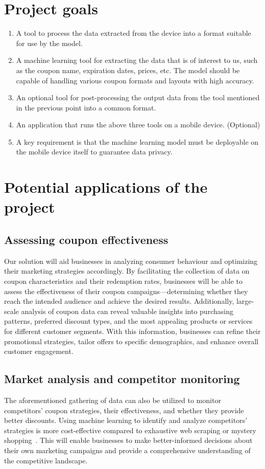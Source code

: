 \documentclass[licencjacka,en]{docs/pracamgr}
\begin{document}
\section{Project goals}
\begin{enumerate}
    \item A tool to process the data extracted from the device into a format suitable for use by the model.
    \item A machine learning tool for extracting the data that is of interest to us, such as the coupon name, expiration dates, prices, etc. The model should be capable of handling various coupon formats and layouts with high accuracy.
    \item An optional tool for post-processing the output data from the tool mentioned in the previous point into a common format.
    \item An application that runs the above three tools on a mobile device. (Optional)
    \item A key requirement is that the machine learning model must be deployable on the mobile device itself to guarantee data privacy.
\end{enumerate} 


\section{Potential applications of the project}
\subsection{Assessing coupon effectiveness}
Our solution will aid businesses in analyzing consumer behaviour and optimizing their marketing strategies accordingly. By facilitating the collection of data on coupon characteristics and their redemption rates, businesses will be able to assess the effectiveness of their coupon campaigns—determining whether they reach the intended audience and achieve the desired results. Additionally, large-scale analysis of coupon data can reveal valuable insights into purchasing patterns, preferred discount types, and the most appealing products or services for different customer segments. With this information, businesses can refine their promotional strategies, tailor offers to specific demographics, and enhance overall customer engagement.

\subsection{Market analysis and competitor monitoring}
The aforementioned gathering of data can also be utilized to monitor competitors' coupon strategies, their effectiveness, and whether they provide better discounts. Using machine learning to identify and analyze competitors' strategies is more cost-effective compared to exhaustive web scraping or mystery shopping~\cite{competitor_tariffs}. This will enable businesses to make better-informed decisions about their own marketing campaigns and provide a comprehensive understanding of the competitive landscape.
\end{document}
